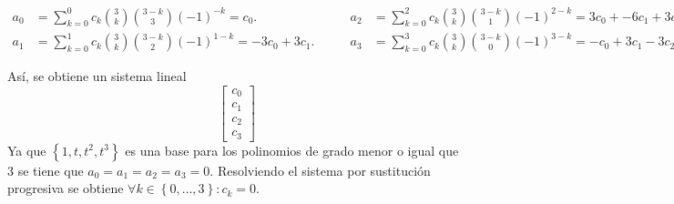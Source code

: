 \begin{frame}
\begin{solution}
        \begin{equation*}
            \begin{aligned}
                a_{0} & =
                \sum_{k=0}^{0}
                c_{k}
                \binom{3}{k}
                \binom{3-k}{3}
                {\left(-1\right)}^{-k}=
                c_{0}.    \\
                a_{1} & =
                \sum_{k=0}^{1}
                c_{k}
                \binom{3}{k}
                \binom{3-k}{2}
                {\left(-1\right)}^{1-k}=
                -3c_{0}+3c_{1}.
            \end{aligned}
            \qquad
            \begin{aligned}
                a_{2} & =
                \sum_{k=0}^{2}
                c_{k}
                \binom{3}{k}
                \binom{3-k}{1}
                {\left(-1\right)}^{2-k}=
                3c_{0}+-6c_{1}+3c_{2}. \\
                a_{3} & =
                \sum_{k=0}^{3}
                c_{k}
                \binom{3}{k}
                \binom{3-k}{0}
                {\left(-1\right)}^{3-k}=
                -c_{0}+3c_{1}-3c_{2}+c_{3}.
            \end{aligned}
        \end{equation*}
    \end{solution}
\end{frame}

\begin{frame}
    Así, se obtiene un sistema lineal
    \begin{equation*}
        \begin{bmatrix}
            c_{0} \\
            c_{1} \\
            c_{2} \\
            c_{3}
        \end{bmatrix}
    \end{equation*}
    Ya que
    \begin{math}
        \left\{
        1,
        t,
        t^{2},
        t^{3}
        \right\}
    \end{math}
    es una base para los polinomios de grado menor o igual que
    $3$ se tiene que
    \begin{math}
        a_{0}=
        a_{1}=
        a_{2}=
        a_{3}=
        0
    \end{math}.
    Resolviendo el sistema por sustitución progresiva se obtiene
    \begin{math}
        \forall k\in\left\{0,\dotsc,3\right\}:
        c_{k}=0
    \end{math}.
\end{frame}